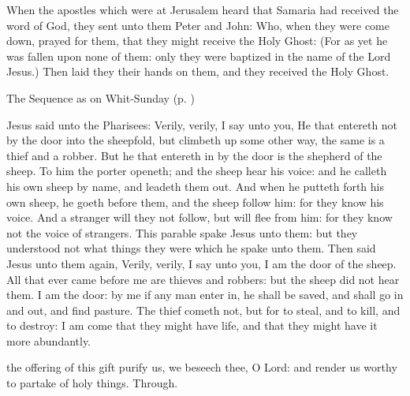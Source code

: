  When the apostles which were at Jerusalem heard that Samaria had received the word of God, they sent unto them Peter and John: Who, when they were come down, prayed for them, that they might receive the Holy Ghost: (For as yet he was fallen upon none of them: only they were baptized in the name of the Lord Jesus.) Then laid they their hands on them, and they received the Holy Ghost.
\begin{rubric}
{The Sequence as on Whit-Sunday (p. \pageref{WhitSeq})}
\end{rubric}

 Jesus said unto the Pharisees: Verily, verily, I say unto you, He that entereth not by the door into the sheepfold, but climbeth up some other way, the same is a thief and a robber. But he that entereth in by the door is the shepherd of the sheep. To him the porter openeth; and the sheep hear his voice: and he calleth his own sheep by name, and leadeth them out. And when he putteth forth his own sheep, he goeth before them, and the sheep follow him: for they know his voice. And a stranger will they not follow, but will flee from him: for they know not the voice of strangers. This parable spake Jesus unto them: but they understood not what things they were which he spake unto them. Then said Jesus unto them again, Verily, verily, I say unto you, I am the door of the sheep. All that ever came before me are thieves and robbers: but the sheep did not hear them. I am the door: by me if any man enter in, he shall be saved, and shall go in and out, and find pasture. The thief cometh not, but for to steal, and to kill, and to destroy: I am come that they might have life, and that they might have it more abundantly.


\vspace{-0.25\baselineskip}

\secret
{} the offering of this gift purify us, we beseech thee, O Lord: and render us worthy to partake of holy things. Through.

